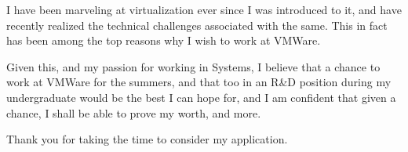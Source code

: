\documentclass[11pt, a4paper]{awesome-cv} %
\begin{document}
\begin{cvletter}
  I have been marveling at virtualization ever since I was introduced
  to it, and have recently realized the technical challenges associated
  with the same. This in fact has been among the top reasons why I wish
  to work at VMWare.

  Given this, and my passion for working in Systems, I believe that a
  chance to work at VMWare for the summers, and that too in an R\&D
  position during my undergraduate would be the best I can hope for,
  and I am confident that given a chance, I shall be able to prove my
  worth, and more.

  Thank you for taking the time to consider my application.


\end{cvletter}


\makeletterclosing %
\end{document}

